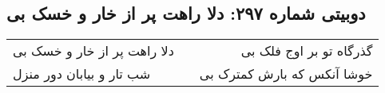 \begin{center}
\section*{دوبیتی شماره ۲۹۷: دلا راهت پر از خار و خسک بی}
\label{sec:297}
\begin{longtable}{l p{0.5cm} r}
دلا راهت پر از خار و خسک بی
&&
گذرگاه تو بر اوج فلک بی
\\
شب تار و بیابان دور منزل
&&
خوشا آنکس که بارش کمترک بی
\\
\end{longtable}
\end{center}
